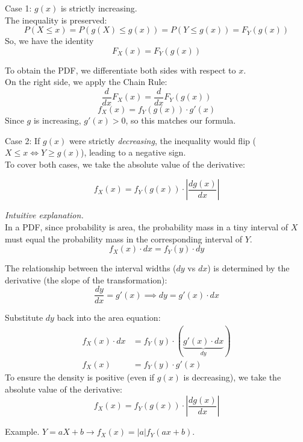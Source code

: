 \documentclass[../Probability.tex]{subfiles}
\begin{document}
\noindent Case 1: $g(x)$ is strictly increasing. \\
The inequality is preserved:
\[
    P(X \leq x) = P(g(X) \leq g(x)) = P(Y \leq g(x)) = F_Y(g(x))
\]
So, we have the identity
\[
    F_X(x) = F_Y(g(x))
\]

\noindent To obtain the PDF, we differentiate both sides with respect to $x$. \\
On the right side, we apply the Chain Rule:
\[
    \frac{d}{dx} F_X(x) = \frac{d}{dx} F_Y(g(x))
\]
\[
    f_X(x) = f_Y(g(x)) \cdot g'(x)
\]
Since $g$ is increasing, $g'(x) > 0$, so this matches our formula.

\noindent Case 2: If $g(x)$ were strictly \textit{decreasing}, the inequality would flip ($X \leq x \iff Y \geq g(x)$), leading to a negative sign. \\
To cover both cases, we take the absolute value of the derivative:

\[
    f_X(x) = f_Y(g(x)) \cdot \left| \frac{dg(x)}{dx} \right|
\]

\noindent\textit{Intuitive explanation.}\\
In a PDF, since probability is area, the probability mass in a tiny interval of $X$ must equal the probability mass in the corresponding interval of $Y$.
\[
    f_X(x) \cdot dx = f_Y(y) \cdot dy
\]

\noindent The relationship between the interval widths ($dy$ vs $dx$) is determined by the derivative (the slope of the transformation):
\[
    \frac{dy}{dx} = g'(x) \implies dy = g'(x) \cdot dx
\]

\noindent Substitute $dy$ back into the area equation:
\begin{align*}
    f_X(x) \cdot dx &= f_Y(y) \cdot (\underbrace{g'(x) \cdot dx}_{dy}) \\
    f_X(x) &= f_Y(y) \cdot g'(x)
\end{align*}
To ensure the density is positive (even if $g(x)$ is decreasing), we take the absolute value of the derivative:
\[
    f_X(x) = f_Y(g(x)) \cdot \left| \frac{dg(x)}{dx} \right|
\]

\medskip
\noindent Example. $Y=aX+b\rightarrow f_X(x)=|a|f_Y(ax+b)$.
\end{document}
